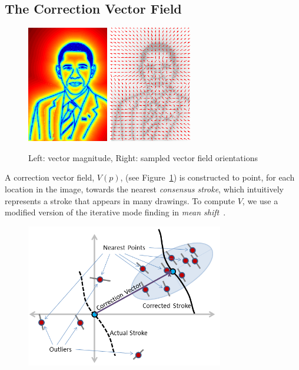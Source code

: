 \subsection{The Correction Vector Field}

\begin{figure}
  \centering%
\includegraphics[height=2in]{figures/imagetable/mag_bo.png}
\hspace{0.1in}
\includegraphics[height=2in]{figures/imagetable/dir_bo.png}
  \caption{Left: vector magnitude, Right: sampled vector field orientations}
  \label{fig:vectorfield}
\end{figure}

A correction vector field, $V(p)$, (see Figure~\ref{fig:vectorfield}) is constructed to point, for each location in the image, towards the nearest {\em consensus stroke}, which intuitively represents a stroke that appears in many drawings. To compute $V$, we use a modified version of the iterative mode finding in {\em mean shift}~\cite{10.1109/ICCV.1999.790416}.


\begin{figure}
  \centering%
  \includegraphics[width=3.4in]{ellipse.png}
  \caption{  }
  \label{fig:ellipse}
\end{figure}


